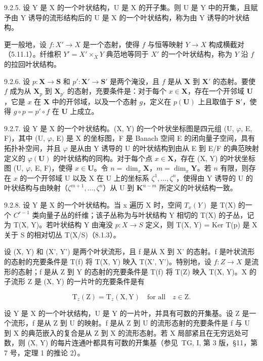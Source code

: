 9.2.5. 设 Y 是 X 的一个叶状结构，U 是 X 的开子集。则 U 是 Y 中的开集，且赋予由 Y 诱导的流形结构后的 U 是 X 的一个叶状结构，称为由 Y 诱导的叶状结构。

更一般地，设 \(f: X' \to X\) 是一个态射，使得 \(f\) 与恒等映射 \(Y \to X\) 构成横截对（5.11.1）。纤维积 \(Y' = X' \times_X Y\) 典范地等同于 \(X'\) 的一个叶状结构，称为 \(Y\) 沿 \(f\) 的拉回叶状结构。

9.2.6. 设 \(p: \mathbf{X} \to \mathbf{S}\) 和 \(p': \mathbf{X}' \to \mathbf{S}'\) 是两个淹没，且 \(f\) 是从 \(\mathbf{X}\) 到 \(\mathbf{X}'\) 的态射。要使 \(f\) 成为从 \(\mathbf{X}_p\) 到 \(\mathbf{X}_{p'}\) 的态射，充要条件是：对于每个 \(x \in \mathbf{X}\)，存在一个开邻域 \(\mathbf{U}\)，它是 \(x\) 在 \(\mathbf{X}\) 中的开邻域，以及一个态射 \(g\)，定义在 \(p(\mathbf{U})\) 上且取值于 \(\mathbf{S}'\)，使得 \(g \circ p = p' \circ f\) 在 \(\mathbf{U}\) 上成立。

9.2.7. 设 Y 是 X 的一个叶状结构。(X, Y) 的一个叶状坐标图是四元组 (U, \(\varphi\), E, F)，其中 (U, \(\varphi\), E) 是 X 的坐标图，F 是 Banach 空间 E 的闭向量子空间，具有拓扑补空间，并且 \(\varphi\) 是从由 Y 诱导的 U 的叶状结构到由从 E 到 E/F 的典范映射定义的 \(\varphi(\mathbf{U})\) 的叶状结构的同构。对于每个点 \(x \in \mathbf{X}\)，存在 (X, Y) 的叶状坐标图 (U, \(\varphi\), E, F)，使得 \(x \in \mathbf{U}\)。令 \(n = \dim_x \mathbf{X}\)，\(m = \dim_x \mathbf{Y}\)。若 \(n\) 有限，则存在 \(x\) 的一个开邻域 U 以及 X 在 U 上的坐标系 \(\zeta^1, \ldots, \zeta^n\)，使得由 Y 诱导的 U 的叶状结构与由映射（\(\zeta^{m+1}, \ldots, \zeta^n\)）从 U 到 \(\mathbf{K}^{n-m}\) 所定义的叶状结构一致。

9.2.8. 设 Y 是 X 的一个叶状结构。当 x 遍历 X 时，空间 \(T_{x}(Y)\) 是 T(X) 的一个 \(C^{r-1}\) 类向量子丛的纤维；该子丛称为与叶状结构 Y 相切的 T(X) 的子丛，记为 T(X, Y)。若叶状结构 Y 由淹没 \(p: X \to S\) 定义，则 T(X, Y) = Ker T(p) 是 X 关于 S 的相对切丛 T(X/S)（8.1.3）。

设 (X, Y) 和 (X', Y') 是两个叶状流形，且 f 是从 X 到 X' 的态射。f 是叶状流形的态射的充要条件是 T(f) 将 T(X, Y) 映入 T(X', Y')。特别地，设 \(f: Z \to X\) 是流形的态射；f 是从 Z 到 Y 的态射的充要条件是 T(f) 将 T(Z) 映入 T(X, Y)。X 的子流形 Z 是 (X, Y) 的一片叶的充要条件是有

\[
\mathrm{T} _ {z} (\mathrm{Z}) = \mathrm{T} _ {z} (\mathrm{X}, \mathrm{Y}) \quad \text {for all} \quad z \in \mathrm{Z}.
\]

设 Y 是 X 的一个叶状结构，U 是 Y 的一片叶，并具有可数的开集基。设 Z 是一个流形，f 是从 Z 到 U 的映射。f 是从 Z 到 U 的流形态射的充要条件是 f 与 U 到 X 的典范嵌入的复合是从 Z 到 X 的流形态射。若 X 局部紧且在无穷远处可数，则 (X, Y) 的每片连通叶都具有可数的开集基（参见~TG, I, 第 3 版，§11，第 7 号，定理 1 的推论 2）。

